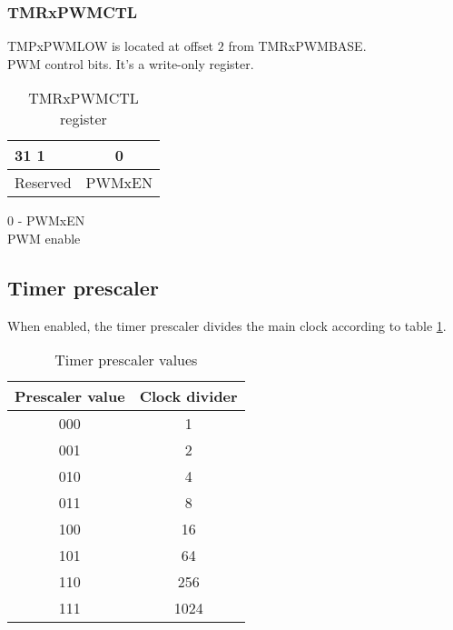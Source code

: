 \subsubsection{TMRxPWMCTL}
TMPxPWMLOW is located at offset $2$ from TMRxPWMBASE.\\
PWM control bits. It's a write-only register.

\begin{table}[H]
\begin{center}
\begin{tabularx}{14cm}{Xc}
31 \hfill 1 & 0  \\
\hline
\multicolumn{1}{|c|}{Reserved} & 
\multicolumn{1}{|c|}{PWMxEN}  \\
\hline
\end{tabularx}
\caption{TMRxPWMCTL register}
\end{center}
\end{table}

\begin{description}

\item{0 - PWMxEN} \hfill \\
PWM enable
\end{description}





\subsection{Timer prescaler}
When enabled, the timer prescaler divides the main clock according to table \ref{timerprescaler}.

\begin{table}[H]
\begin{center}
\begin{tabularx}{6cm}{|c|c|}
\hline
Prescaler value & Clock divider \\
\hline
000 & 1 \\
\hline
001 & 2 \\
\hline
010 & 4 \\
\hline
011 & 8 \\
\hline  
100 & 16  \\
\hline
101 & 64  \\
\hline
110 & 256 \\
\hline
111 & 1024 \\
\hline
\end{tabularx}
\caption{Timer prescaler values}\label{timerprescaler}
\end{center}
\end{table}

